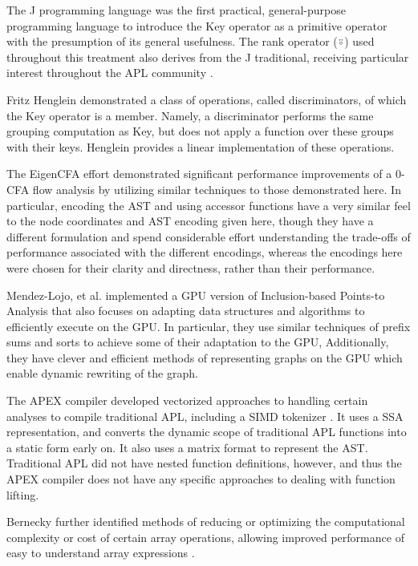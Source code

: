 \documentclass[numbers,preprint]{sigplanconf}
\begin{document}
The J programming language \cite{hui2014key} was the first practical,
general-purpose programming language to introduce the Key operator as a
primitive operator with the presumption of its general usefulness. The
rank operator (⍤) used throughout this treatment also derives from
the J traditional, receiving particular interest throughout the APL
community \cite{bernecky1987rank,hui1995rank}.

Fritz Henglein demonstrated a class of operations, called
discriminators, of which the Key operator is a member.  
\cite{henglein2013dd}
Namely,
a discriminator performs the same grouping computation as Key, but
does not apply a function over these groups with their keys. Henglein
provides a linear implementation of these operations.

The EigenCFA effort \cite{prabhu2011eigencfa} demonstrated significant performance
improvements of a 0-CFA flow analysis by utilizing similar techniques
to those demonstrated here. In particular, encoding the AST and using
accessor functions have a very similar feel to the node coordinates and
AST encoding given here, though they have a different formulation and
spend considerable effort understanding the trade-offs of performance
associated with the different encodings, whereas the encodings here
were chosen for their clarity and directness, rather than their
performance.

Mendez-Lojo, et al. implemented a GPU version of Inclusion-based
Points-to Analysis \cite{mendez2012inclusion} that also focuses on 
adapting data structures
and algorithms to efficiently execute on the GPU. In particular,
they use similar techniques of prefix sums and sorts to achieve some
of their adaptation to the GPU, Additionally, they have clever and
efficient methods of representing graphs on the GPU which enable
dynamic rewriting of the graph.

The APEX compiler \cite{bernecky1997apex} developed vectorized approaches to handling
certain analyses to compile traditional APL, including a SIMD tokenizer
\cite{bernecky2003tokenizer}.
 It uses a SSA representation, and converts the dynamic scope of
traditional APL functions into a static form early on. It also uses
a matrix format to represent the AST. Traditional APL did not have
nested function definitions, however, and thus the APEX compiler does
not have any specific approaches to dealing with function lifting.

Bernecky further identified methods of reducing or optimizing the
computational complexity or cost of certain array operations, allowing
improved performance of easy to understand array expressions
\cite{bernecky1999reducing}.
\end{document}
